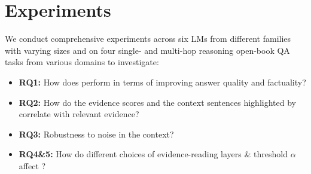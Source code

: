 \section{Experiments}\label{sec:exp}
We conduct comprehensive experiments across six LMs from different families with varying sizes and on four single- and multi-hop reasoning open-book QA tasks from various domains to investigate:
\vspace{-2mm}
\begin{itemize}[leftmargin=*]
    \setlength{\itemsep}{-3pt}
    \item \textbf{RQ1:} How does \se perform in terms of improving answer quality and factuality?
    \item \textbf{RQ2:} How do the evidence scores and the context sentences highlighted by \se correlate with relevant evidence?
    \item \textbf{RQ3:} Robustness to noise in the context?
    \item \textbf{RQ4\&5:} How do different choices of evidence-reading layers \& threshold $\alpha$ affect \se?
\end{itemize}
\vspace{-2mm}


